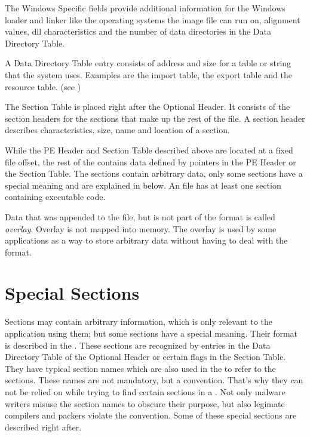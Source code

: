 The Windows Specific fields provide additional information for the Windows loader and linker like the operating systems the image file can run on, alignment values, dll characteristics and the number of data directories in the Data Directory Table.

A Data Directory Table entry consists of address and size for a table or string that the system uses. Examples are the import table, the export table and the resource table. (see \cite[]{pespec})

The Section Table is placed right after the Optional Header. It consists of the section headers for the sections that make up the rest of the \PE{} file. A section header describes \ia{} characteristics, size, name and location of a section.

While the PE Header and Section Table described above are located at a fixed file offset, the rest of the \PE{} contains data defined by pointers in the PE Header or the Section Table. The sections contain arbitrary data, only some sections have a special meaning and are explained in \emph{} below. An \EXE{} file has at least one section containing executable code.

Data that was appended to the file, but is not part of the \PE{} format is called \emph{overlay}. Overlay is not mapped into memory. The overlay is used by some applications as a way to store arbitrary data without having to deal with the \PE{} format. 

\section{Special Sections} \label{sec:specialsections}

Sections may contain arbitrary information, which is only relevant to the application using them; but some sections have a special meaning. Their format is described in the \PECOFF{} \cite{pespec}. These sections are recognized by entries in the Data Directory Table of the Optional Header or certain flags in the Section Table. They have typical section names which are also used in the \PECOFF{} to refer to the sections. These names are not mandatory, but a convention. That's why they can not be relied on while trying to find certain sections in a \PE{}. Not only malware writers misuse the section names to obscure their purpose, but also legimate compilers and packers violate the convention. 
Some of these special sections are described right after. 

